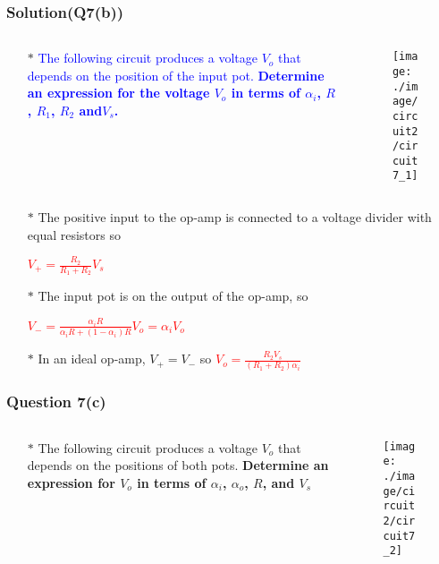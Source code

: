 \documentclass{beamer}
\newcommand{\blue}[1]{\textcolor{blue}{#1}}
\newcommand{\red}[1]{\textcolor{red}{#1}}
\begin{document}
\begin{frame}
\frametitle{Solution(Q7(b))}
\begin{columns}

\begin{column}{6cm}
\begin{itemize} \itemsep1pt \parskip0pt 
  \item[$\ast$] \blue{The following circuit produces a voltage $V_o$ that depends on the position of the input pot. {\bf Determine an expression for the voltage $V_o$ in terms of $\alpha_i$, $R$, $R_1$, $R_2$ and$V_s$.}}
\end{itemize}
\end{column}


\begin{column}{6cm}
\begin{figure}[H]
  \centering
  \texttt{[image: ./image/circuit2/circuit7\_1]}
\end{figure}
\end{column}

\end{columns}


\begin{itemize} \itemsep1pt \parskip0pt 
  \item[$\ast$] The positive input to the op-amp is connected to a voltage divider with equal resistors so
  \item[] \red{$V_+ = \frac{R_2}{R_1 + R_2}V_s$}
  \item[$\ast$] The input pot is on the output of the op-amp, so
  \item[] \red{$V_- = \frac{\alpha_iR}{\alpha_iR + (1-\alpha_i)R}V_o = \alpha_iV_o$}
  \item[$\ast$] In an ideal op-amp, $V_+ = V_-$ so \red{$V_o = \frac{R_2V_s}{(R_1 + R_2)\alpha_i}$}
\end{itemize}


\end{frame}


\begin{frame}
\frametitle{Question 7(c)}
\begin{columns}
\begin{column}{6 cm}
\begin{itemize} \itemsep1pt \parskip0pt 
  \item[$\ast$] The following circuit produces a voltage $V_o$ that depends on the positions of both pots. {\bf Determine an expression for $V_o$ in terms of $\alpha_i$, $\alpha_o$, $R$, and $V_s$}
\end{itemize}
\vspace{6 cm}
\end{column}
\begin{column}{6 cm}
\begin{figure}[H]
  \centering
  \texttt{[image: ./image/circuit2/circuit7\_2]}
\end{figure}
\end{column}
\end{columns}
\end{frame}
\end{document}
